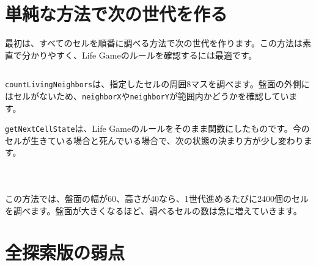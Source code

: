 \section{単純な方法で次の世代を作る}

最初は、すべてのセルを順番に調べる方法で次の世代を作ります。この方法は素直で分かりやすく、Life Gameのルールを確認するには最適です。

\begin{listing}[htbp]
\inputminted{ts}{typescript-p5/listings/chapter18/life-game-rules.ts}
\caption{周囲の生きているセルを数え、次の状態を決める（\texttt{chapter18/life-game-rules.ts}）}
\label{lst:chapter18-life-rules}
\end{listing}

\texttt{countLivingNeighbors}は、指定したセルの周囲8マスを調べます。盤面の外側にはセルがないため、\texttt{neighborX}や\texttt{neighborY}が範囲内かどうかを確認しています。

\texttt{getNextCellState}は、Life Gameのルールをそのまま関数にしたものです。今のセルが生きている場合と死んでいる場合で、次の状態の決まり方が少し変わります。

\begin{listing}[htbp]
\inputminted[firstline=1,lastline=35]{ts}{typescript-p5/listings/chapter18/life-game-full-scan.ts}
\caption{全探索版のスケッチ（\texttt{chapter18/life-game-full-scan.ts}）}
\label{lst:chapter18-full-scan-sketch}
\end{listing}

\begin{listing}[htbp]
\inputminted[firstline=38,lastline=61]{ts}{typescript-p5/listings/chapter18/life-game-full-scan.ts}
\caption{すべてのセルを調べて次の世代を作る（\texttt{chapter18/life-game-full-scan.ts}）}
\label{lst:chapter18-full-scan-update}
\end{listing}

\begin{listing}[htbp]
\inputminted[firstline=63,lastline=111]{ts}{typescript-p5/listings/chapter18/life-game-full-scan.ts}
\caption{全探索版で使う近傍判定（\texttt{chapter18/life-game-full-scan.ts}）}
\label{lst:chapter18-full-scan-rules}
\end{listing}

この方法では、盤面の幅が60、高さが40なら、1世代進めるたびに2400個のセルを調べます。盤面が大きくなるほど、調べるセルの数は急に増えていきます。

\section{全探索版の弱点}

